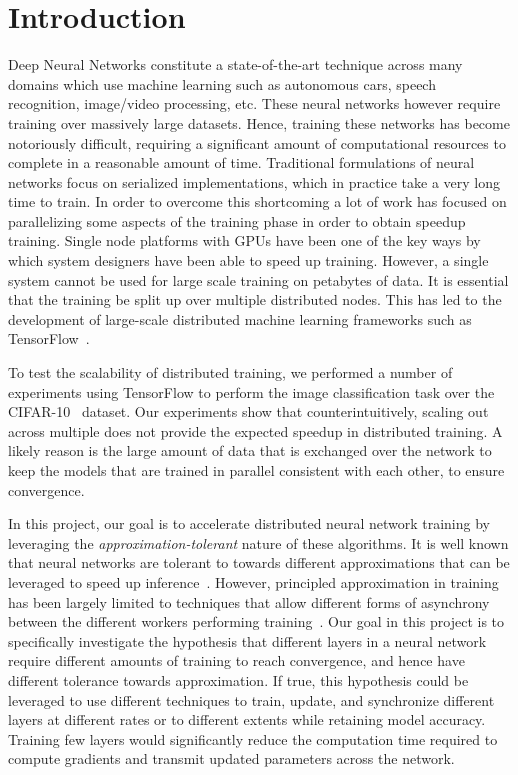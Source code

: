 \section{Introduction}
Deep Neural Networks constitute a state-of-the-art technique across many domains which use machine learning such as autonomous cars, speech recognition, image/video processing, etc. These neural networks however require training over massively large datasets. Hence, training these networks has become notoriously difficult, requiring a significant amount of computational resources to complete in a reasonable amount of time. Traditional formulations of neural networks focus on serialized implementations, which in practice take a very long time to train. In order to overcome this shortcoming a lot of work has focused on parallelizing some aspects of the training phase in order to obtain speedup training. Single node platforms with GPUs have been one of the key ways by which system designers have been able to speed up training. However, a single system cannot be used for large scale training on petabytes of data. It is essential that the training be split up over multiple distributed nodes. This has led to the development of large-scale distributed machine learning frameworks such as TensorFlow~\cite{tensorflow}. 

To test the scalability of distributed training, we performed a number of experiments using TensorFlow to perform the image classification task over the CIFAR-10~\cite{cifar10} dataset. Our experiments show that counterintuitively, scaling out across multiple does not provide the expected speedup in distributed training. A likely reason is the large amount of data that is exchanged over the network to keep the models that are trained in parallel consistent with each other, to ensure convergence. 

In this project, our goal is to accelerate distributed neural network training by leveraging the \emph{approximation-tolerant} nature of these algorithms. It is well known that neural networks are tolerant to towards different approximations that can be leveraged to speed up inference~\cite{x,y}. However, principled approximation in training has been largely limited to techniques that allow different forms of asynchrony between the different workers performing training~\cite{x,y,z}. Our goal in this project is to specifically investigate the hypothesis that different layers in a neural network require different amounts of training to reach convergence, and hence have different tolerance towards approximation. If true, this hypothesis could be leveraged to use different techniques to train, update, and synchronize different layers at different rates or to different extents while retaining model accuracy. Training few layers would significantly reduce the computation time required to compute gradients and transmit updated parameters across the network.  

